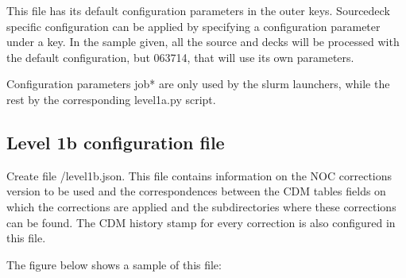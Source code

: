 \documentclass[letterpaper,10pt,english]{sphinxmanual}
\begin{document}
\begin{sphinxVerbatim}[commandchars=\\\{\}]
       
       \PYG{p}{[}\PYG{p}{]}
         \PYG{p}{[}\PYG{p}{]}
       
\end{sphinxVerbatim}

This file has its default configuration parameters in the outer keys.
Source\sphinxhyphen{}deck specific configuration can be applied by specifying a configuration
parameter under a  key. In the sample given, all the
source and decks will be processed with the default configuration, but 063\sphinxhyphen{}714,
that will use its own parameters.

Configuration parameters job* are only used by the slurm launchers, while the
rest by the corresponding level1a.py script.


\subsection{Level 1b configuration file}
\label{\detokenize{index:level-1b-configuration-file}}\label{\detokenize{index:level1b-config-file}}
Create file /level1b.json. This file contains information on
the NOC corrections version to be used and the correspondences between the
CDM tables fields on which the corrections are applied and the subdirectories
where these corrections can be found. The CDM history stamp for every correction
is also configured in this file.

The figure below shows a sample of this file:
\end{document}
